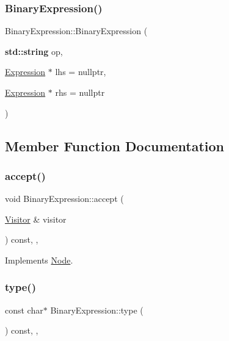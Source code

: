 \subsubsection{\texorpdfstring{Binary\+Expression()}{BinaryExpression()}}
{\footnotesize\ttfamily Binary\+Expression\+::\+Binary\+Expression (\begin{DoxyParamCaption}\item[{\textbf{ std\+::string}}]{op,  }\item[{\hyperlink{struct_expression}{Expression} $\ast$}]{lhs = {\ttfamily nullptr},  }\item[{\hyperlink{struct_expression}{Expression} $\ast$}]{rhs = {\ttfamily nullptr} }\end{DoxyParamCaption})\hspace{0.3cm}{\ttfamily [inline]}}



\subsection{Member Function Documentation}
\mbox{\label{struct_binary_expression_af8318bd8b21b4bbca064e8a6086a10a0}} 
\subsubsection{\texorpdfstring{accept()}{accept()}}
{\footnotesize\ttfamily void Binary\+Expression\+::accept (\begin{DoxyParamCaption}\item[{\hyperlink{struct_visitor}{Visitor} \&}]{visitor }\end{DoxyParamCaption}) const\hspace{0.3cm}{\ttfamily [inline]}, {\ttfamily [override]}, {\ttfamily [virtual]}}



Implements \hyperlink{struct_node_a10bd7af968140bbf5fa461298a969c71}{Node}.

\mbox{\label{struct_binary_expression_a9ab583e823bac39ed8fd8eb34747ac9f}} 
\subsubsection{\texorpdfstring{type()}{type()}}
{\footnotesize\ttfamily const char$\ast$ Binary\+Expression\+::type (\begin{DoxyParamCaption}{ }\end{DoxyParamCaption}) const\hspace{0.3cm}{\ttfamily [inline]}, {\ttfamily [override]}, {\ttfamily [virtual]}}



